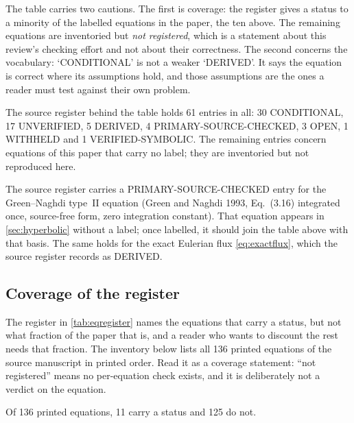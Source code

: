 The table carries two cautions. The first is coverage: the register gives a status to a minority of the
labelled equations in the paper, the ten above. The remaining equations are inventoried but
\emph{not registered}, which is a statement about this review's checking effort and not about their
correctness. The second concerns the vocabulary: `CONDITIONAL' is not a weaker `DERIVED'. It says the
equation is correct where its assumptions hold, and those assumptions are the ones a reader must test
against their own problem.

The source register behind the table holds 61 entries in all: 30 CONDITIONAL, 17
UNVERIFIED, 5 DERIVED, 4 PRIMARY-SOURCE-CHECKED, 3 OPEN, 1 WITHHELD and 1 VERIFIED-SYMBOLIC. The remaining
entries concern equations of this paper that carry no label; they are inventoried but not reproduced
here.

The source register carries a PRIMARY-SOURCE-CHECKED entry for the Green--Naghdi type~II equation (Green
and Naghdi 1993, Eq.~(3.16) integrated once, source-free form, zero integration constant). That equation
appears in \cref{sec:hyperbolic} without a label; once labelled, it should join the table above with that
basis. The same holds for the exact Eulerian flux \eqref{eq:exactflux}, which the source register
records as DERIVED.

\subsection{Coverage of the register}\label{sec:eqcoverage}

The register in \cref{tab:eqregister} names the equations that carry a status, but not what
fraction of the paper that is, and a reader who wants to discount the rest needs that fraction. The
inventory below lists all 136 printed equations of the source manuscript in printed order.
Read it as a coverage statement: ``not registered'' means no per-equation check exists, and it is
deliberately not a verdict on the equation.

\noindent Of 136 printed equations, 11 carry a status and 125 do not.

